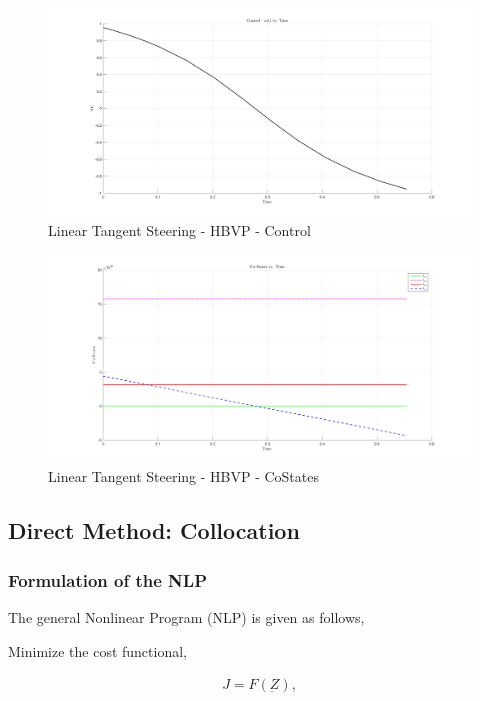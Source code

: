 \documentclass[11pt,usenames]{article}
\begin{document}
	\begin{figure}[htpb]
		\centering
		\includegraphics[scale=0.13]{HBVP_LTS_Control.jpg}
		\caption{Linear Tangent Steering - HBVP - Control}
	\end{figure}
	
	\begin{figure}[htpb]
		\centering
		\includegraphics[scale=0.13]{HBVP_LTS_CoStates.jpg}
		\caption{Linear Tangent Steering - HBVP - CoStates}
	\end{figure}
	
	\newpage
	
	
	
	\subsection{Direct Method: Collocation}
	
	\subsubsection{Formulation of the NLP}
	
	The general Nonlinear Program (NLP) is given as follows,
	
	Minimize the cost functional,
	
	\begin{align} 
	J = F(\underbar Z),
	\end{align}
	
\end{document}
